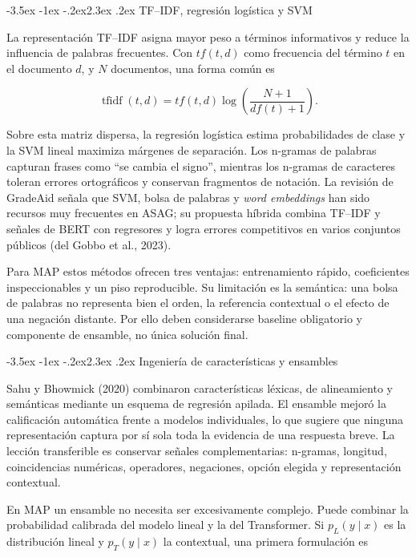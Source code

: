 \documentclass[11pt,oneside,openany]{book}
\makeatletter
\renewcommand\section{\@startsection{section}{1}{\z@}%
  {-3.5ex \@plus -1ex \@minus -.2ex}{2.3ex \@plus .2ex}%
  {\normalfont\Large\sffamily\bfseries\color{AzulMedio}}}
\makeatother
\begin{document}
\section{TF--IDF, regresión logística y SVM}

La representación TF--IDF asigna mayor peso a términos informativos y reduce la
influencia de palabras frecuentes. Con $tf(t,d)$ como frecuencia del término $t$
en el documento $d$, y $N$ documentos, una forma común es

\[
\operatorname{tfidf}(t,d)=tf(t,d)\log\left(\frac{N+1}{df(t)+1}\right).
\]

Sobre esta matriz dispersa, la regresión logística estima probabilidades de clase
y la SVM lineal maximiza márgenes de separación. Los n-gramas de palabras capturan
frases como ``se cambia el signo'', mientras los n-gramas de caracteres toleran
errores ortográficos y conservan fragmentos de notación. La revisión de GradeAid
señala que SVM, bolsa de palabras y \emph{word embeddings} han sido recursos muy
frecuentes en ASAG; su propuesta híbrida combina TF--IDF y señales de BERT con
regresores y logra errores competitivos en varios conjuntos públicos (del Gobbo
et al., 2023).

Para MAP estos métodos ofrecen tres ventajas: entrenamiento rápido, coeficientes
inspeccionables y un piso reproducible. Su limitación es la semántica: una bolsa de
palabras no representa bien el orden, la referencia contextual o el efecto de una
negación distante. Por ello deben considerarse baseline obligatorio y componente
de ensamble, no única solución final.

\section{Ingeniería de características y ensambles}

Sahu y Bhowmick (2020) combinaron características léxicas, de alineamiento y
semánticas mediante un esquema de regresión apilada. El ensamble mejoró la
calificación automática frente a modelos individuales, lo que sugiere que ninguna
representación captura por sí sola toda la evidencia de una respuesta breve. La
lección transferible es conservar señales complementarias: n-gramas, longitud,
coincidencias numéricas, operadores, negaciones, opción elegida y representación
contextual.

En MAP un ensamble no necesita ser excesivamente complejo. Puede combinar la
probabilidad calibrada del modelo lineal y la del Transformer. Si $p_L(y\mid x)$
es la distribución lineal y $p_T(y\mid x)$ la contextual, una primera formulación
es
\end{document}
